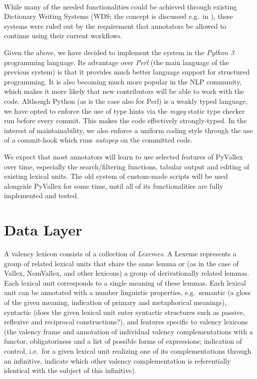 \documentclass[10pt, a4paper]{article}
\begin{document}
\paragraph{} While many of the needed functionalities could be achieved through existing Dictionary Writing Systems
(WDS; the concept is discussed e.g.\ in \cite{Abel12DWS}), these systems were ruled out by the requirement that annotators be allowed
to continue using their current workflows.

Given the above, we have decided to implement the system in the \emph{Python 3} programming
language. Its advantage over \emph{Perl} (the main language of the previous system) is that it provides
much better language support for structured programming. It is also becoming much more popular in
the NLP community, which makes it more likely that new contributors will be able to work with the
code. Although Python (as is the case also for Perl) is a weakly typed language, we have opted
to enforce the use of type hints via the \emph{mypy} static type checker \cite{tool:mypy} run before every commit.
This makes the code effectively strongly-typed. In the interest of maintainability, we also enforce
a uniform coding style through the use of a commit-hook which runs \emph{autopep} \cite{tool:autopep8}
on the committed code.

We expect that most annotators will learn to use selected features of PyVallex over time, especially the search/filtering functions, tabular output and editing of existing lexical units.
The old system of custom-made scripts will be used alongside PyVallex for some time, until all of its functionalities are fully implemented and tested.


\section{Data Layer}
A valency lexicon consists of a collection of \emph{Lexemes}. A Lexeme represents a group of related
lexical units that share the same lemma or (as in the case of Vallex, NomVallex, and other lexicons) a group of derivationally related lemmas.
Each lexical unit corresponds to a single meaning of these lemmas. Each lexical unit can be annotated
with a number linguistic properties, e.g.\
semantic (a gloss of the given meaning,
indication of primary and metaphorical meanings),
syntactic (does the given lexical unit enter syntactic structures such as passive, reflexive and reciprocal constructions?),
and features specific to valency lexicons
(the valency frame and annotation of individual valency complementations with a functor, obligatoriness and a list of possible forms of expressions;
indication of control, i.e.\ for a given lexical unit realizing one of its complementations through an infinitive,
indicate which other valency complementation is referentially identical with the subject of this infinitive).
\end{document}

